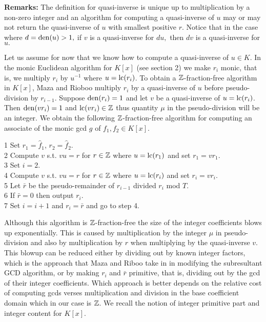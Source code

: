 \documentclass[10pt]{article}
\begin{document}
\bigskip
\noindent
{\bf Remarks:} The definition for quasi-inverse is unique up to multiplication
by a non-zero integer and an algorithm for computing a quasi-inverse of $u$ may
or may not return the quasi-inverse of $u$ with smallest positive $r$.
Notice that in the case where $d = {\rm den}(u) > 1,$ if $v$ is a quasi-inverse
for $d u,$ then $d v$ is a quasi-inverse for $u.$

\bigskip
Let us assume for now that we know how to compute a quasi-inverse of $u \in K$.
In the monic Euclidean algorithm for $K[x]$ (see section 2) we make $r_i$ monic,
that is, we multiply $r_i$ by $u^{-1}$ where $u = {\rm lc}(r_i)$.  To obtain
a ${\mathbb Z}$-fraction-free algorithm in $K[x]$, Maza and Rioboo multiply $r_i$ by a
quasi-inverse of $u$ before pseudo-division by $r_{i-1}$.
Suppose ${\rm den}(r_i)=1$ and let $v$ be a quasi-inverse of $u={\rm lc}(r_i)$.
Then ${\rm den}(v r_i)=1$ and ${\rm lc}(v r_i) \in {\mathbb Z}$ thus
quantity $\mu$ in the pseudo-division will be an integer.
We obtain the following ${\mathbb Z}$-fraction-free algorithm for computing an
associate of the monic gcd $g$ of $f_1, f_2 \in K[x].$

\bigskip
\noindent
\hspace*{5mm} 1  Set $r_1 = \hat f_1$, $r_2 = \hat f_2$. \\
\hspace*{5mm} 2  Compute $v$ s.t. $v u = r$ for $r \in {\mathbb Z}$ where $u = {\rm lc}(r_1)$ and set $r_1 = v r_1.$ \\
\hspace*{5mm} 3  Set $i=2.$ \\
\hspace*{5mm} 4  Compute $v$ s.t. $v u = r$ for $r \in {\mathbb Z}$ where $u = {\rm lc}(r_i)$ and set $r_i = v r_i.$ \\
\hspace*{5mm} 5  \hspace*{5mm} Let $\bar r$ be the pseudo-remainder of $r_{i-1}$ divided $r_i$ mod $T$. \\
\hspace*{5mm} 6  \hspace*{5mm} If $\bar r=0$ then output $r_i$. \\
\hspace*{5mm} 7  \hspace*{5mm} Set $i = i+1$ and $r_i = \bar r$ and go to step 4.

\bigskip
\noindent Although this algorithm is ${\mathbb Z}$-fraction-free the size of
the integer coefficients blows up exponentially.  This is caused by
multiplication by the integer $\mu$ in pseudo-division and also by
multiplication by $r$ when multiplying by the quasi-inverse $v.$
This blowup can be reduced either by dividing out by known integer
factors, which is the approach that Maza and Riboo take in
\cite{Maza} in modifying the subresultant GCD algorithm, or by
making $r_i$ and $\bar r$ primitive, that is, dividing out by the
gcd of their integer coefficients. Which approach is better depends
on the relative cost of computing gcds verses multiplication and
division in the base coefficient domain which in our case is ${\mathbb Z}$.
We recall the notion of integer primitive part and integer content
for $K[x]$.
\end{document}
